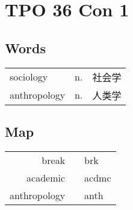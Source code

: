 \section{TPO 36 Con 1}

\subsection{Words}

\begin{tabular}{lll}
    sociology    & n. & 社会学 \\
    anthropology & n. & 人类学 \\
\end{tabular}

\subsection{Map}

\begin{tabular}{rc@{\quad$\to$\quad}l}
    break        &  & brk   \\
    academic     &  & acdmc \\
    anthropology &  & anth  \\
\end{tabular}

